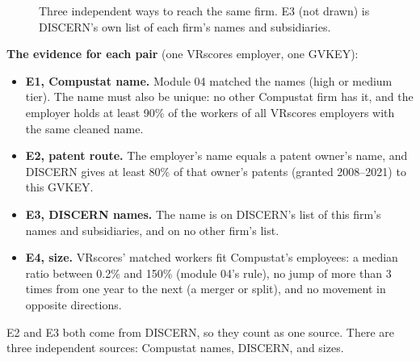 \documentclass[11pt,a4paper]{article}
\begin{document}
\begin{figure}[H]
\centering
{}
\caption{Three independent ways to reach the same firm. E3 (not drawn) is DISCERN's own list of each firm's names and subsidiaries.}\label{fig:triangle}
\end{figure}

\textbf{The evidence for each pair} (one VRscores employer, one GVKEY):
\begin{itemize}\setlength{\itemsep}{2pt}
\item \textbf{E1, Compustat name.} Module 04 matched the names (high or medium tier). The name must also be unique: no other Compustat firm has it, and the employer holds at least 90\% of the workers of all VRscores employers with the same cleaned name.
\item \textbf{E2, patent route.} The employer's name equals a patent owner's name, and DISCERN gives at least 80\% of that owner's patents (granted 2008--2021) to this GVKEY.
\item \textbf{E3, DISCERN names.} The name is on DISCERN's list of this firm's names and subsidiaries, and on no other firm's list.
\item \textbf{E4, size.} VRscores' matched workers fit Compustat's employees: a median ratio between 0.2\% and 150\% (module 04's rule), no jump of more than 3 times from one year to the next (a merger or split), and no movement in opposite directions.
\end{itemize}
E2 and E3 both come from DISCERN, so they count as one source. There are three independent sources: Compustat names, DISCERN, and sizes.
\end{document}
